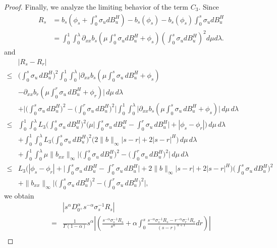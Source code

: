 \documentclass[preprint,12pt]{elsarticle}
\theoremstyle{definition}  %
\theoremstyle{plain}  %
\begin{document}
\begin{proof}
Finally, we analyze the limiting behavior of the term $C_3$. Since 
\begin{align*}
    R_s&=b_s\left(\phi_s+\int_0^s \sigma_udB^H_u\right)-b_s(\phi_s)-b_s(\phi_s)\int_0^s \sigma_udB^H_u\\
    &=\int_0^1 \int_0^\lambda \partial_{xx}b_s(\mu\int_0^s \sigma_udB^H_u+\phi_s) \left(\int_0^s \sigma_udB^H_u\right)^2 d\mu d\lambda.
\end{align*}
and
\begin{align*}
&|R_s - R_r| \\
\leq &
  \bigg(\int_0^s \sigma_u\, dB^H_u\bigg)^2 
  \int_0^1 \int_0^\lambda 
  \Big|
     \partial_{xx}b_s\!\left(\mu \int_0^s \sigma_u\, dB^H_u + \phi_s\right)\\
     &- \partial_{xx}b_r\!\left(\mu \int_0^r \sigma_u\, dB^H_u + \phi_r\right)
  \Big| \, d\mu\, d\lambda \\
& + 
  \Bigg|
     \bigg(\int_0^s \sigma_u\, dB^H_u\bigg)^2 
     - \bigg(\int_0^r \sigma_u\, dB^H_u\bigg)^2
  \Bigg| 
  \int_0^1 \int_0^\lambda 
     \Big|\partial_{xx}b_s\!\left(\mu \int_0^s \sigma_u\, dB^H_u + \phi_s\right)\Big| 
  \, d\mu\, d\lambda \\[1ex]
\leq  &
  \int_0^1 \int_0^\lambda 
     L_3 \bigg(\int_0^s \sigma_u\, dB^H_u\bigg)^2 
     \Big(
        \mu\Big|\int_0^s \sigma_u\, dB^H_u - \int_0^r \sigma_u\, dB^H_u\Big|
        + |\phi_s - \phi_r|
     \Big)\, d\mu\, d\lambda \\
& +
  \int_0^1 \int_0^\lambda 
     L_3 \bigg(\int_0^s \sigma_u\, dB^H_u\bigg)^2 
     \Big(
        2\|b\|_\infty |s-r| + 2|s-r|^H
     \Big)\, d\mu\, d\lambda \\
& +
  \int_0^1 \int_0^\lambda 
     \mu \|b_{xx}\|_\infty 
     \Bigg|
        \bigg(\int_0^s \sigma_u\, dB^H_u\bigg)^2 
        - \bigg(\int_0^r \sigma_u\, dB^H_u\bigg)^2
     \Bigg| \, d\mu\, d\lambda \\[1ex]
\leq &
  L_3 \Big(
        |\phi_s - \phi_r| 
        + \Big|\int_0^s \sigma_u\, dB^H_u - \int_0^r \sigma_u\, dB^H_u\Big|
        + 2\|b\|_\infty |s-r|
        + 2|s-r|^H
     \Big)
     \bigg(\int_0^s \sigma_u\, dB^H_u\bigg)^2 \\
& + 
  \|b_{xx}\|_\infty 
  \Bigg|
     \bigg(\int_0^s \sigma_u\, dB^H_u\bigg)^2 
     - \bigg(\int_0^r \sigma_u\, dB^H_u\bigg)^2
  \Bigg|,
\end{align*}
we obtain
\begin{align*}
     & |s^{\alpha}D_{0^+}^\alpha s^{-\alpha} \sigma_s^{-1}R_s|\\
     =&\frac{1}{\Gamma(1-\alpha)}  s^{\alpha}\left|\left( \frac{ s^{-\alpha} \sigma_s^{-1}R_s}{s^\alpha} + \alpha \int_0^s \frac{ s^{-\alpha} \sigma_s^{-1}R_s -  r^{-\alpha} \sigma_r^{-1}R_r}{(s - r)^{\alpha+1}}  dr \right)\right|\\

\end{align*}
\end{proof}
\end{document}
